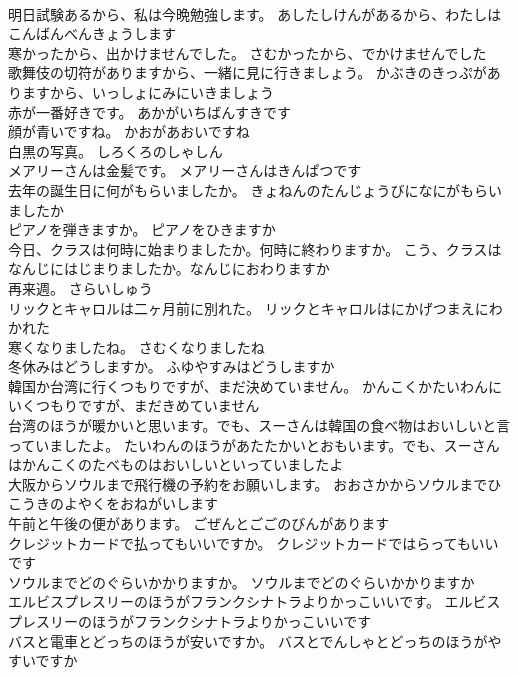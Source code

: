 \documentclass[8pt]{extreport}
\begin{document}
\begin{CJK}{UTF8}{min}
\\	明日試験あるから、私は今晩勉強します。	あしたしけんがあるから、わたしはこんばんべんきょうします 
\\	寒かったから、出かけませんでした。	さむかったから、でかけませんでした 
\\	歌舞伎の切符がありますから、一緒に見に行きましょう。	かぶきのきっぷがありますから、いっしょにみにいきましょう 
\\	赤が一番好きです。	あかがいちばんすきです 
\\	顔が青いですね。	かおがあおいですね 
\\	白黒の写真。	しろくろのしゃしん 
\\	メアリーさんは金髪です。	メアリーさんはきんぱつです 
\\	去年の誕生日に何がもらいましたか。	きょねんのたんじょうびになにがもらいましたか 
\\	ピアノを弾きますか。	ピアノをひきますか 
\\	今日、クラスは何時に始まりましたか。何時に終わりますか。	こう、クラスはなんじにはじまりましたか。なんじにおわりますか 
\\	再来週。	さらいしゅう 
\\	リックとキャロルは二ヶ月前に別れた。	リックとキャロルはにかげつまえにわかれた 
\\	寒くなりましたね。	さむくなりましたね 
\\	冬休みはどうしますか。	ふゆやすみはどうしますか 
\\	韓国か台湾に行くつもりですが、まだ決めていません。	かんこくかたいわんにいくつもりですが、まだきめていません 
\\	台湾のほうが暖かいと思います。でも、スーさんは韓国の食べ物はおいしいと言っていましたよ。	たいわんのほうがあたたかいとおもいます。でも、スーさんはかんこくのたべものはおいしいといっていましたよ 
\\	大阪からソウルまで飛行機の予約をお願いします。	おおさかからソウルまでひこうきのよやくをおねがいします 
\\	午前と午後の便があります。	ごぜんとごごのびんがあります 
\\	クレジットカードで払ってもいいですか。	クレジットカードではらってもいいです 
\\	ソウルまでどのぐらいかかりますか。	ソウルまでどのぐらいかかりますか 
\\	エルビスプレスリーのほうがフランクシナトラよりかっこいいです。	エルビスプレスリーのほうがフランクシナトラよりかっこいいです 
\\	バスと電車とどっちのほうが安いですか。	バスとでんしゃとどっちのほうがやすいですか 

\end{CJK}
\end{document}
